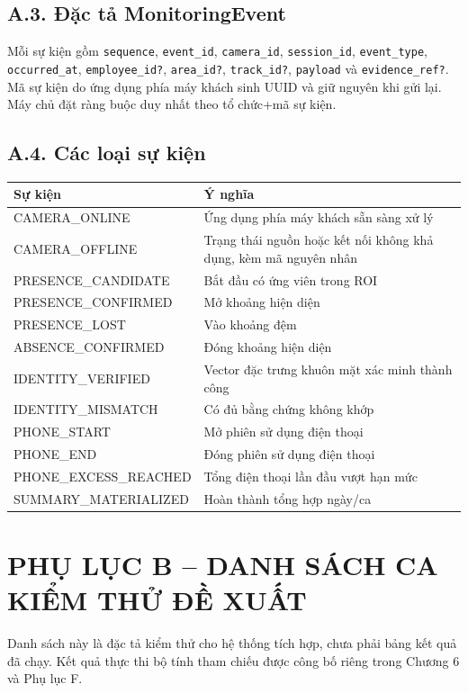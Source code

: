 \subsection*{A.3. Đặc tả MonitoringEvent}
Mỗi sự kiện gồm \texttt{sequence}, \texttt{event\_id}, \texttt{camera\_id}, \texttt{session\_id}, \texttt{event\_type}, \texttt{occurred\_at}, \texttt{employee\_id?}, \texttt{area\_id?}, \texttt{track\_id?}, \texttt{payload} và \texttt{evidence\_ref?}. Mã sự kiện do ứng dụng phía máy khách sinh UUID và giữ nguyên khi gửi lại. Máy chủ đặt ràng buộc duy nhất theo tổ chức+mã sự kiện.

\subsection*{A.4. Các loại sự kiện}
\begin{longtable}{p{4.4cm}p{8.8cm}}
\toprule
\textbf{Sự kiện} & \textbf{Ý nghĩa}\\
\midrule\endfirsthead
CAMERA\_ONLINE & Ứng dụng phía máy khách sẵn sàng xử lý\\
CAMERA\_OFFLINE & Trạng thái nguồn hoặc kết nối không khả dụng, kèm mã nguyên nhân\\
PRESENCE\_\allowbreak CANDIDATE & Bắt đầu có ứng viên trong ROI\\
PRESENCE\_\allowbreak CONFIRMED & Mở khoảng hiện diện\\
PRESENCE\_LOST & Vào khoảng đệm\\
ABSENCE\_\allowbreak CONFIRMED & Đóng khoảng hiện diện\\
IDENTITY\_\allowbreak VERIFIED & Vector đặc trưng khuôn mặt xác minh thành công\\
IDENTITY\_\allowbreak MISMATCH & Có đủ bằng chứng không khớp\\
PHONE\_START & Mở phiên sử dụng điện thoại\\
PHONE\_END & Đóng phiên sử dụng điện thoại\\
PHONE\_\allowbreak EXCESS\_\allowbreak REACHED & Tổng điện thoại lần đầu vượt hạn mức\\
SUMMARY\_\allowbreak MATERIALIZED & Hoàn thành tổng hợp ngày/ca\\
\bottomrule
\end{longtable}

\clearpage
\section*{PHỤ LỤC B -- DANH SÁCH CA KIỂM THỬ ĐỀ XUẤT}
Danh sách này là đặc tả kiểm thử cho hệ thống tích hợp, chưa phải bảng kết quả đã chạy. Kết quả thực thi bộ tính tham chiếu được công bố riêng trong Chương 6 và Phụ lục F.

